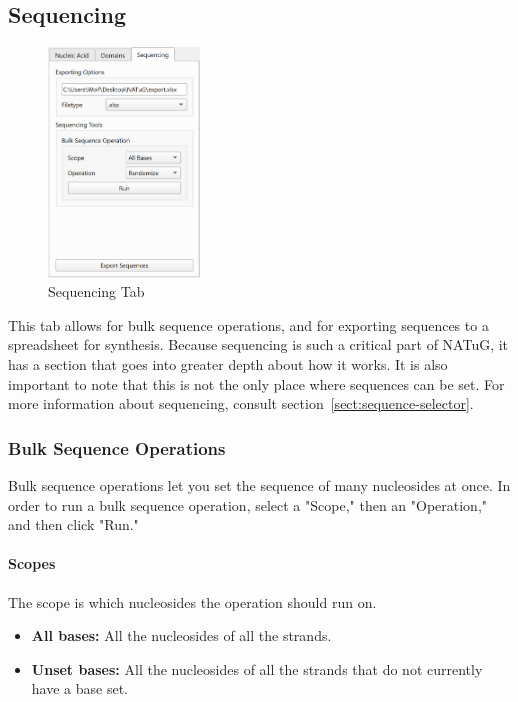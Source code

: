 \documentclass[titlepage]{article}
\begin{document}
\subsection{Sequencing}

\begin{figure}[h] \label{fig:sequencing-tab}
	\centering
	\caption{Sequencing Tab}
	\includegraphics[height=2.4in]{sequencing-tab.png}
\end{figure}

This tab allows for bulk sequence operations, and for exporting sequences to a spreadsheet for synthesis. Because sequencing is such a critical part of NATuG, it has a section that goes into greater depth about how it works. It is also important to note that this is not the only place where sequences can be set. For more information about sequencing, consult section~\ref{sect:sequence-selector}.

\subsubsection{Bulk Sequence Operations}
Bulk sequence operations let you set the sequence of many nucleosides at once. In order to run a bulk sequence operation, select a "Scope," then an "Operation," and then click "Run."

\paragraph{Scopes}
The scope is which nucleosides the operation should run on.

\begin{itemize}
	\item \textbf{All bases:} All the nucleosides of all the strands.
	\item \textbf{Unset bases:} All the nucleosides of all the strands that do not currently have a base set.
\end{itemize}
\end{document}
